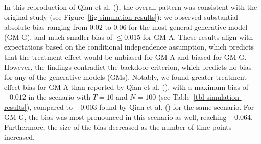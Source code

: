 \documentclass[
  11pt,
  a4paper,
]{article}
\begin{document}
\begin{figure}[H]
\begin{minipage}{0.50\linewidth}
{}

\end{minipage}%
%
\begin{minipage}{0.50\linewidth}



\end{minipage}%

\end{figure}%

In this reproduction of Qian et al. (), the
overall pattern was consistent with the original study (see
Figure~\ref{fig-simulation-results}): we observed substantial absolute
bias ranging from \(0.02\) to \(0.06\) for the most general generative
model (GM G), and much smaller bias of \(\leq 0.015\) for GM A. These
results align with expectations based on the conditional independence
assumption, which predicts that the treatment effect would be unbiased
for GM A and biased for GM G. However, the findings contradict the
backdoor criterion, which predicts no bias for any of the generative
models (GMs). Notably, we found greater treatment effect bias for GM A
than reported by Qian et al. (), with a
maximum bias of \(-0.012\) in the scenario with \(T = 10\) and
\(N = 100\) (see Table~\ref{tbl-simulation-results}), compared to
\(-0.003\) found by Qian et al. () for the
same scenario. For GM G, the bias was most pronounced in this scenario
as well, reaching \(-0.064\). Furthermore, the size of the bias
decreased as the number of time points increased.
\end{document}
